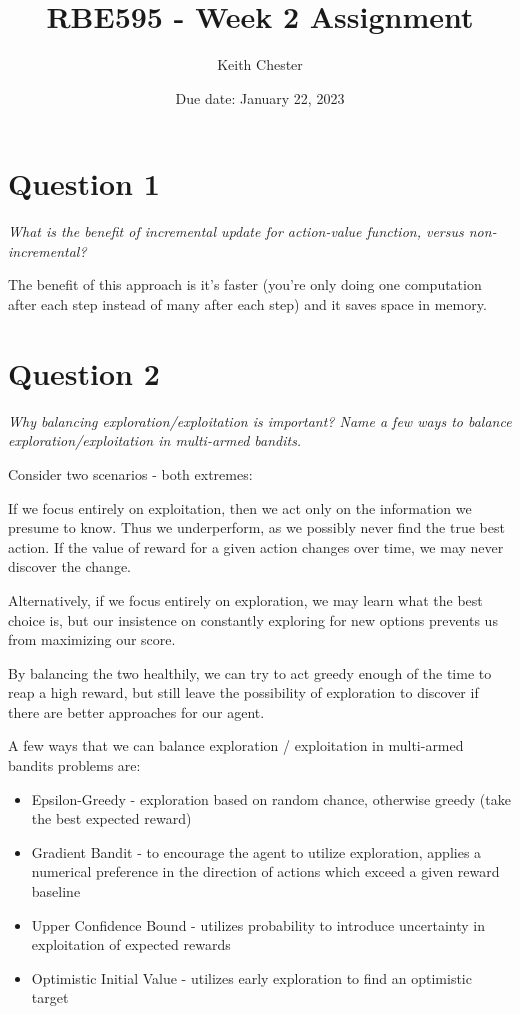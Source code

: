 \documentclass{article}
\title{RBE595 - Week 2 Assignment}
\author{Keith Chester}
\date{Due date: January 22, 2023}
\begin{document}
\maketitle

\section*{Question 1}

\textit{What is the benefit of incremental update for action-value function, versus non-incremental?}

The benefit of this approach is it's faster (you're only doing one computation after each step instead of many after each step) and it saves space in memory.

\section*{Question 2}

\textit{Why balancing exploration/exploitation is important? Name a few ways to balance exploration/exploitation in multi-armed bandits.}

Consider two scenarios - both extremes:

If we focus entirely on exploitation, then we act only on the information we presume to know. Thus we underperform, as we possibly never find the true best action. If the value of reward for a given action changes over time, we may never discover the change.

Alternatively, if we focus entirely on exploration, we may learn what the best choice is, but our insistence on constantly exploring for new options prevents us from maximizing our score.

By balancing the two healthily, we can try to act greedy enough of the time to reap a high reward, but still leave the possibility of exploration to discover if there are better approaches for our agent.

A few ways that we can balance exploration / exploitation in multi-armed bandits problems are:

\begin{itemize}
    \item Epsilon-Greedy - exploration based on random chance, otherwise greedy (take the best expected reward)
    \item Gradient Bandit - to encourage the agent to utilize exploration, applies a numerical preference in the direction of actions which exceed a given reward baseline
    \item Upper Confidence Bound - utilizes probability to introduce uncertainty in exploitation of expected rewards
    \item Optimistic Initial Value - utilizes early exploration to find an optimistic target
\end{itemize}
\end{document}
